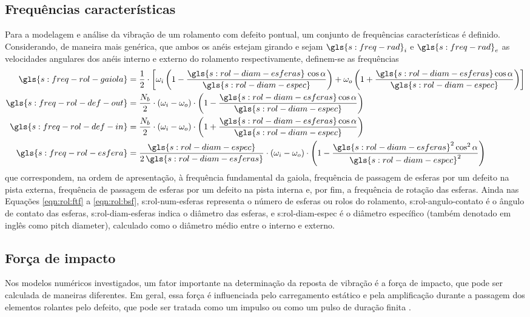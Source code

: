 \documentclass[12pt,oneside,english,brazil]{ucsmono}
\begin{document}
	\subsection{Frequências características}
	Para a modelagem e análise da vibração de um rolamento com defeito pontual, um conjunto de frequências características é definido. Considerando, de maneira mais genérica, que ambos os anéis estejam girando e sejam $ \gls{s:freq-rad}_i $ e $ \gls{s:freq-rad}_e $ as velocidades angulares dos anéis interno e externo do rolamento respectivamente, definem-se as frequências \cite{sassi:2007}
	\begin{align}
		\gls{s:freq-rol-gaiola} &= \frac{1}{2}\cdot\left[ \omega_i\left(1-\frac{\gls{s:rol-diam-esferas}\,\cos\alpha}{\gls{s:rol-diam-espec}} \right) + \omega_o\left(1+\frac{\gls{s:rol-diam-esferas}\cos\alpha}{\gls{s:rol-diam-espec}} \right) \right] \label{eqn:rol:ftf}\\
		\gls{s:freq-rol-def-out} &= \frac{N_b}{2}\cdot(\omega_i-\omega_o)\cdot\left(1-\frac{\gls{s:rol-diam-esferas}\cos\alpha}{\gls{s:rol-diam-espec}} \right) \label{eqn:rol:bpfo}\\
		\gls{s:freq-rol-def-in} &= \frac{N_b}{2}\cdot(\omega_i-\omega_o)\cdot\left(1+\frac{\gls{s:rol-diam-esferas}\cos\alpha}{\gls{s:rol-diam-espec}} \right) \label{eqn:rol:bpfi}\\
		\gls{s:freq-rol-esfera} &= \frac{\gls{s:rol-diam-espec}}{2\,\gls{s:rol-diam-esferas}}\cdot(\omega_i-\omega_o)\cdot\left(1-\frac{\gls{s:rol-diam-esferas}^2\cos^2\alpha}{\gls{s:rol-diam-espec}^2} \right) \label{eqn:rol:bsf}
	\end{align}
	que correspondem, na ordem de apresentação, à frequência fundamental da gaiola, frequência de passagem de esferas por um defeito na pista externa, frequência de passagem de esferas por um defeito na pista interna e, por fim, a frequência de rotação das esferas. Ainda nas Equações \ref{eqn:rol:ftf} a \ref{eqn:rol:bsf}, \gls{s:rol-num-esferas} representa o número de esferas ou rolos do rolamento, \gls{s:rol-angulo-contato} é o ângulo de contato das esferas, \gls{s:rol-diam-esferas} indica o diâmetro das esferas, e \gls{s:rol-diam-espec} é o diâmetro específico (também denotado em inglês como \foreignlanguage{english}{pitch diameter}), calculado como o diâmetro médio entre o interno e externo.
	
	\subsection{Força de impacto}
	Nos modelos numéricos investigados, um fator importante na determinação da reposta de vibração é a força de impacto, que pode ser calculada de maneiras diferentes. Em geral, essa força é influenciada pelo carregamento estático e pela amplificação durante a passagem dos elementos rolantes pelo defeito, que pode ser tratada como um impulso \cite{mcfadden:1984,sassi:2007,cong:2013} ou como um pulso de duração finita \cite{tandon:1997}.
	
\end{document}
